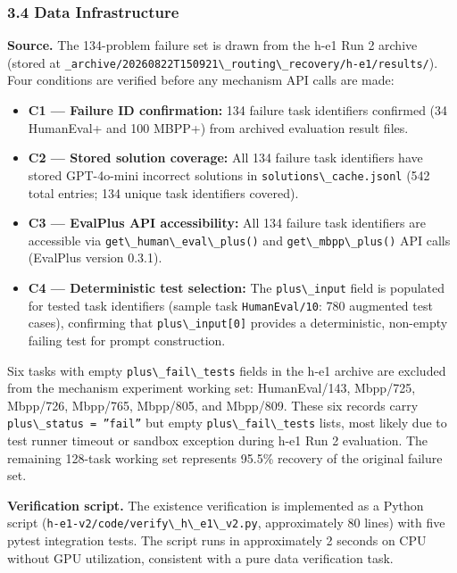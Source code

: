 \subsubsection{3.4 Data Infrastructure}

\textbf{Source.} The 134-problem failure set is drawn from the h-e1 Run 2 archive (stored at \texttt{\_archive/20260822T150921\textbackslash \_routing\textbackslash \_recovery/h-e1/results/}). Four conditions are verified before any mechanism API calls are made:

\begin{itemize}
\item \textbf{C1 --- Failure ID confirmation:} 134 failure task identifiers confirmed (34 HumanEval+ and 100 MBPP+) from archived evaluation result files.
\item \textbf{C2 --- Stored solution coverage:} All 134 failure task identifiers have stored GPT-4o-mini incorrect solutions in \texttt{solutions\textbackslash \_cache.jsonl} (542 total entries; 134 unique task identifiers covered).
\item \textbf{C3 --- EvalPlus API accessibility:} All 134 failure task identifiers are accessible via \texttt{get\textbackslash \_human\textbackslash \_eval\textbackslash \_plus()} and \texttt{get\textbackslash \_mbpp\textbackslash \_plus()} API calls (EvalPlus version 0.3.1).
\item \textbf{C4 --- Deterministic test selection:} The \texttt{plus\textbackslash \_input} field is populated for tested task identifiers (sample task \texttt{HumanEval/10}: 780 augmented test cases), confirming that \texttt{plus\textbackslash \_input[0]} provides a deterministic, non-empty failing test for prompt construction.
\end{itemize}

Six tasks with empty \texttt{plus\textbackslash \_fail\textbackslash \_tests} fields in the h-e1 archive are excluded from the mechanism experiment working set: HumanEval/143, Mbpp/725, Mbpp/726, Mbpp/765, Mbpp/805, and Mbpp/809. These six records carry \texttt{plus\textbackslash \_status = ''fail''} but empty \texttt{plus\textbackslash \_fail\textbackslash \_tests} lists, most likely due to test runner timeout or sandbox exception during h-e1 Run 2 evaluation. The remaining 128-task working set represents 95.5\% recovery of the original failure set.

\textbf{Verification script.} The existence verification is implemented as a Python script (\texttt{h-e1-v2/code/verify\textbackslash \_h\textbackslash \_e1\textbackslash \_v2.py}, approximately 80 lines) with five pytest integration tests. The script runs in approximately 2 seconds on CPU without GPU utilization, consistent with a pure data verification task.

